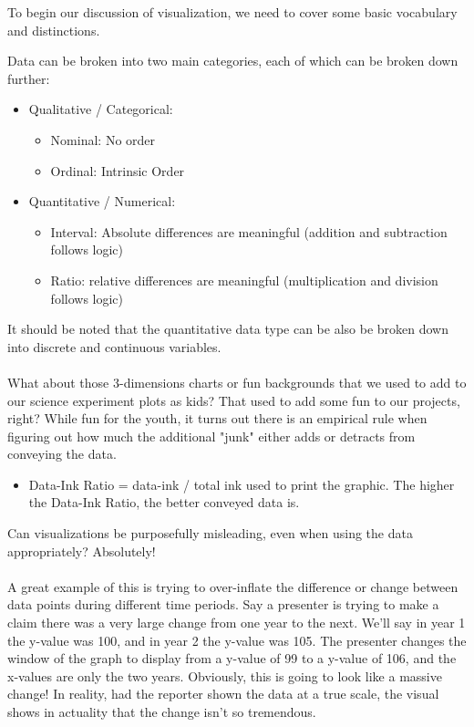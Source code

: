 To begin our discussion of visualization, we need to cover some basic vocabulary and distinctions.

Data can be broken into two main categories, each of which can be broken down further:
\begin{itemize}
	\item Qualitative / Categorical:
	\begin{itemize}
		\item Nominal: No order
		\item Ordinal: Intrinsic Order
	\end{itemize}
	\item Quantitative / Numerical:
	\begin{itemize}
		\item Interval: Absolute differences are meaningful (addition and subtraction follows logic)
		\item Ratio: relative differences are meaningful (multiplication and division follows logic)
	\end{itemize}
\end{itemize}

It should be noted that the quantitative data type can be also be broken down into discrete and continuous variables.
\\\\

What about those 3-dimensions charts or fun backgrounds that we used to add to our science experiment plots as kids? That used to add some fun to our projects, right? While fun for the youth, it turns out there is an empirical rule when figuring out how much the additional "junk" either adds or detracts from conveying the data.
\begin{itemize}
	\item Data-Ink Ratio = data-ink / total ink used to print the graphic. The higher the Data-Ink Ratio, the better conveyed data is.
\end{itemize}

Can visualizations be purposefully misleading, even when using the data appropriately? Absolutely!
\\\\

A great example of this is trying to over-inflate the difference or change between data points during different time periods. Say a presenter is trying to make a claim there was a very large change from one year to the next. We'll say in year 1 the y-value was 100, and in year 2 the y-value was 105. The presenter changes the window of the graph to display from a y-value of 99 to a y-value of 106, and the x-values are only the two years. Obviously, this is going to look like a massive change! In reality, had the reporter shown the data at a true scale, the visual shows in actuality that the change isn't so tremendous.
\\\\

